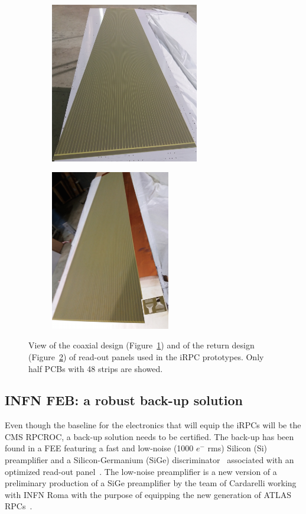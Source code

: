 	\begin{figure}[H]
		\begin{subfigure}{.5\linewidth}
		    \centering
			\includegraphics[height=7cm]{fig/chapt6/RPCROC_Coaxial_PCB.png}
			\caption{\label{fig:iRPC-readout:A}}
		\end{subfigure}
		\begin{subfigure}{.5\linewidth}
		    \centering
			\includegraphics[height=7cm]{fig/chapt6/RPCROC_Return_PCB.png}
			\caption{\label{fig:iRPC-readout:B}}
		\end{subfigure}
		\caption{\label{fig:iRPC-readout} View of the coaxial design (Figure~\ref{fig:iRPC-readout:A}) and of the return design (Figure~\ref{fig:iRPC-readout:B}) of read-out panels used in the iRPC prototypes. Only half PCBs with 48 strips are showed.}
	\end{figure}

	\subsection{INFN \acl{FEB}: a robust back-up solution}
	\label{chapt6:ssec:INFN}
	
	Even though the baseline for the electronics that will equip the iRPCs will be the CMS RPCROC, a back-up solution needs to be certified. The back-up has been found in a \acl{FEE} featuring a fast and low-noise (1000 $e^-$ rms) Silicon (Si) preamplifier and a Silicon-Germanium (SiGe) discriminator~\cite{PIZZIMENTO2018} associated with an optimized read-out panel~\cite{ALUNNOCAMELIA2018}. The low-noise preamplifier is a new version of a preliminary production of a SiGe preamplifier by the team of Cardarelli working with INFN Roma with the purpose of equipping the new generation of ATLAS RPCs~\cite{CARDARELLI2013}.
	
